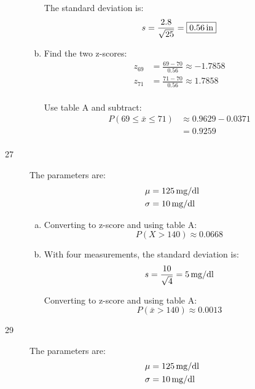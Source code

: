 \documentclass[letterpaper, landscape]{exam}
\begin{document}
\begin{description}
\begin{enumerate}[(a)]
            The standard deviation is:
            \[
              s = \frac{2.8}{\sqrt{25}} = \boxed{ \unit[0.56]{in} }
            \]

          \item Find the two z-scores:
            \begin{align*}
              z_{69} &= \frac{69 - 70}{0.56} \approx -1.7858 \\
              z_{71} &= \frac{71 - 70}{0.56} \approx 1.7858 \\
            \end{align*}

            Use table A and subtract:
            \begin{align*}
              P(69 \leq \bar{x} \leq 71) & \approx 0.9629 - 0.0371 \\
                                         & = \boxed{ 0.9259 } \\
            \end{align*}

        \end{enumerate}

      \item[27]
        The parameters are:
        \begin{align*}
          \mu    & = \unit[125]{mg/dl} \\
          \sigma & = \unit[10]{mg/dl} \\
        \end{align*}

        \begin{enumerate}[(a)]
          \item 
            Converting to z-score and using table A:\@
            \[
              P(X > 140) \approx \boxed{ 0.0668 }
            \]

          \item 
            With four measurements, the standard deviation is:
            \[
              s = \frac{10}{\sqrt{4}} = \unit[5]{mg/dl}
            \]

            Converting to z-score and using table A:\@
            \[
              P(\bar{x} > 140) \approx \boxed{ 0.0013 }
            \]
        \end{enumerate}

      \item[29]
        The parameters are:
        \begin{align*}
          \mu    & = \unit[125]{mg/dl} \\
          \sigma & = \unit[10]{mg/dl} \\
        \end{align*}


\end{description}
\end{document}
